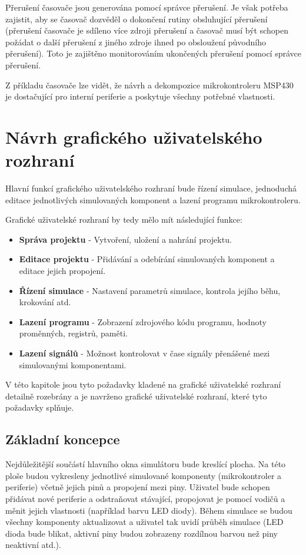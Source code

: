 Přerušení časovače jsou generována pomocí správce přerušení. Je však potřeba zajistit, aby se časovač dozvěděl o dokončení rutiny obsluhující přerušení
(přerušení časovače je sdíleno více zdroji přerušení a časovač musí být schopen požádat o další přerušení z jiného zdroje ihned po obsloužení původního přerušení). Toto je zajištěno monitorováním ukončených přerušení pomocí správce přerušení.

Z příkladu časovače lze vidět, že návrh a dekompozice mikrokontroleru MSP430 je dostačující pro interní periferie a poskytuje všechny potřebné vlastnosti.


\section{Návrh grafického uživatelského rozhraní}

Hlavní funkcí grafického uživatelského rozhraní bude řízení simulace, jednoduchá editace jednotlivých simulovaných komponent a lazení programu mikrokontroleru.

Grafické uživatelské rozhraní by tedy mělo mít následující funkce:

\begin{itemize}
\item \textbf{Správa projektu} - Vytvoření, uložení a nahrání projektu.
\item \textbf{Editace projektu} - Přidávání a odebírání simulovaných komponent a editace jejich propojení.
\item \textbf{Řízení simulace} - Nastavení parametrů simulace, kontrola jejího běhu, krokování atd.
\item \textbf{Lazení programu} - Zobrazení zdrojového kódu programu, hodnoty proměnných, registrů, paměti.
\item \textbf{Lazení signálů} - Možnost kontrolovat v čase signály přenášené mezi simulovanými komponentami.
\end{itemize}

V této kapitole jsou tyto požadavky kladené na grafické uživatelské rozhraní detailně rozebrány a je navrženo grafické uživatelské rozhraní, které tyto
požadavky splňuje.

\subsection{Základní koncepce}

Nejdůležitější součástí hlavního okna simulátoru bude kreslící plocha. Na této ploše budou vykresleny jednotlivé simulované komponenty (mikrokontroler
a periferie) včetně jejich pinů a propojení mezi piny. Uživatel bude schopen přidávat nové periferie a odstraňovat stávající, propojovat je pomocí
vodičů a měnit jejich vlastnosti (například barvu LED diody). Během simulace se budou všechny komponenty aktualizovat a uživatel tak uvidí průběh simulace
(LED dioda bude blikat, aktivní piny budou zobrazeny rozdílnou barvou než piny neaktivní atd.).

